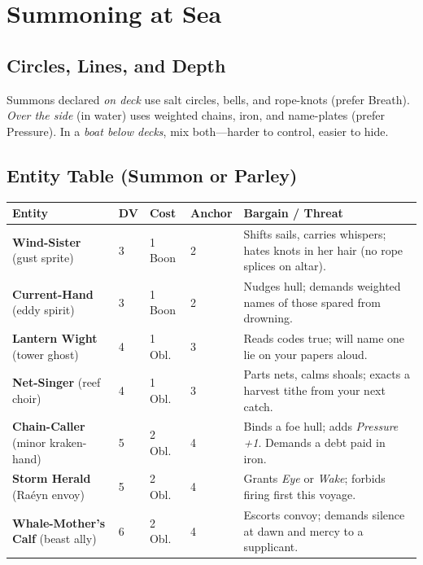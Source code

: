 \documentclass[11pt,oneside]{book}
\begin{document}
\section{Summoning at Sea}

\subsection*{Circles, Lines, and Depth}
Summons declared \emph{on deck} use salt circles, bells, and rope-knots (prefer Breath). \emph{Over the side} (in water) uses weighted chains, iron, and name-plates (prefer Pressure). In a \emph{boat below decks}, mix both---harder to control, easier to hide.

\subsection*{Entity Table (Summon or Parley)}
\begin{tabularx}{\linewidth}{@{}p{3.1cm} p{1.1cm} p{1.5cm} p{2.2cm} X@{}}
\toprule
\textbf{Entity} & \textbf{DV} & \textbf{Cost} & \textbf{Anchor} & \textbf{Bargain / Threat}\\
\midrule
\textbf{Wind-Sister} (gust sprite) & 3 & 1 Boon & 2 & Shifts sails, carries whispers; hates knots in her hair (no rope splices on altar).\\
\textbf{Current-Hand} (eddy spirit) & 3 & 1 Boon & 2 & Nudges hull; demands weighted names of those spared from drowning.\\
\textbf{Lantern Wight} (tower ghost) & 4 & 1 Obl. & 3 & Reads codes true; will name one lie on your papers aloud.\\
\textbf{Net-Singer} (reef choir) & 4 & 1 Obl. & 3 & Parts nets, calms shoals; exacts a harvest tithe from your next catch.\\
\textbf{Chain-Caller} (minor kraken-hand) & 5 & 2 Obl. & 4 & Binds a foe hull; adds \emph{Pressure +1}. Demands a debt paid in iron.\\
\textbf{Storm Herald} (Raéyn envoy) & 5 & 2 Obl. & 4 & Grants \emph{Eye} or \emph{Wake}; forbids firing first this voyage.\\
\textbf{Whale-Mother's Calf} (beast ally) & 6 & 2 Obl. & 4 & Escorts convoy; demands silence at dawn and mercy to a supplicant.\\
\bottomrule
\end{tabularx}
\end{document}
